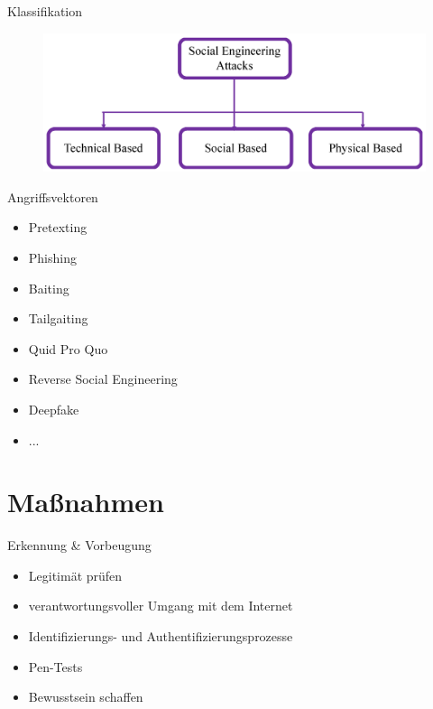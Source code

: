 \documentclass{beamer}
\begin{document}
\begin{frame}{Klassifikation}
    \begin{figure}[!htp]
        \centering
        \includegraphics[scale=.12]{Klassifikation.png}
    \end{figure}
    \begin{center}
    \end{center}
    \nocite{survey}
\end{frame}

\begin{frame}{Angriffsvektoren}
    \Large{
        \begin{itemize}
            \item Pretexting
            \item Phishing
            \item Baiting
            \item Tailgaiting
            \item Quid Pro Quo
            \item Reverse Social Engineering
            \item Deepfake
            \item ...
        \end{itemize}
    }
\end{frame}

\section{Maßnahmen}

\begin{frame}{Erkennung \& Vorbeugung}
    \Large{
        \begin{itemize}
            \item Legitimät prüfen
            \item verantwortungsvoller Umgang mit dem Internet
            \item Identifizierungs- und Authentifizierungsprozesse
            \item Pen-Tests
            \item Bewusstsein schaffen
        \end{itemize}
    }
\end{frame}
\end{document}
